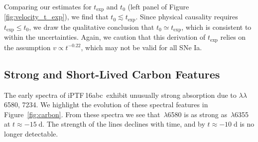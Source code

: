 \documentclass[twocolumn]{aastex61}
\newcommand{\abc}{iPTF\,16abc}
\newcommand{\ycao}[1]{{\color{red} ycao: {#1}}}
\begin{document}
Comparing our estimates for $t_\mathrm{exp}$ and $t_0$ (left panel of 
Figure \ref{fig:velocity_t_exp}), we find that 
$t_0\lesssim t_\mathrm{exp}$.
Since physical causality requires $t_\mathrm{exp} \le t_0$, we draw the qualitative
conclusion that $t_0\simeq t_\mathrm{exp}$, which is consistent to within the uncertainties. Again, we caution that this derivation of $t_\mathrm{exp}$ relies on the assumption $v \propto t^{-0.22}$, which may not be valid for all SNe Ia.  


\subsection{Strong and Short-Lived Carbon Features}
\label{sec:carbon}

The early spectra of \abc\ exhibit unusually strong absorption due 
to  $\lambda\lambda$6580, 7234. We highlight the evolution 
of these spectral features in Figure~\ref{fig:carbon}. From these 
spectra we see that \,$\lambda$6580 is as strong as 
\,$\lambda$6355 at $t \approx -15 \; \mathrm{d}$. The 
strength of the  lines declines with time, and by $t \approx -10 \; \mathrm{d}$  is no longer detectable.
\end{document}
